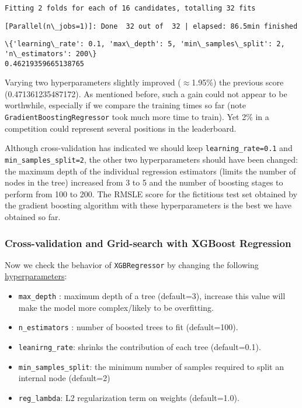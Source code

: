 \documentclass[11pt]{article}
\providecommand{\tightlist}{%
      \setlength{\itemsep}{0pt}\setlength{\parskip}{0pt}}
\begin{document}
{    \begin{Verbatim}[commandchars=\\\{\}]
Fitting 2 folds for each of 16 candidates, totalling 32 fits
    \end{Verbatim}

    \begin{Verbatim}[commandchars=\\\{\}]
[Parallel(n\_jobs=1)]: Done  32 out of  32 | elapsed: 86.5min finished
    \end{Verbatim}

    \begin{Verbatim}[commandchars=\\\{\}]
\{'learning\_rate': 0.1, 'max\_depth': 5, 'min\_samples\_split': 2, 'n\_estimators': 200\}
0.46219359665138765
    \end{Verbatim}

    Varying two hyperparameters slightly improved ($\approx$1.95\%) the
previous score (0.471361235487172). As mentioned before, such a gain
could not appear to be worthwhile, especially if we compare the training
times so far (note \texttt{GradientBoostingRegressor} took much more
time to train). Yet 2\% in a competition could represent several
positions in the leaderboard.

Although cross-validation has indicated we should keep
\texttt{learning\_rate=0.1} and \texttt{min\_samples\_split=2}, the
other two hyperparameters should have been changed: the maximum depth of
the individual regression estimators (limits the number of nodes in the
tree) increased from 3 to 5 and the number of boosting stages to perform
from 100 to 200. The RMSLE score for the fictitious test set obtained by
the gradient boosting algorithm with these hyperparameters is the best
we have obtained so far.

    \subsubsection{Cross-validation and Grid-search with XGBoost
Regression}\label{cross-validation-and-grid-search-with-xgboost-regression}

\hspace{0.5cm} Now we check the behavior of \texttt{XGBRegressor} by changing the
following
\href{http://xgboost.readthedocs.io/en/latest/python/python_api.html}{hyperparameters}:

\begin{itemize}
\tightlist
\item
  \texttt{max\_depth} : maximum depth of a tree (default=3), increase
  this value will make the model more complex/likely to be overfitting.
\item
  \texttt{n\_estimators} : number of boosted trees to fit (default=100).
\item
  \texttt{leanirng\_rate}: shrinks the contribution of each tree
  (default=0.1).
\item
  \texttt{min\_samples\_split}: the minimum number of samples required
  to split an internal node (default=2)
\item
  \texttt{reg\_lambda}: L2 regularization term on weights (default=1.0).
\end{itemize}

}
\end{document}
